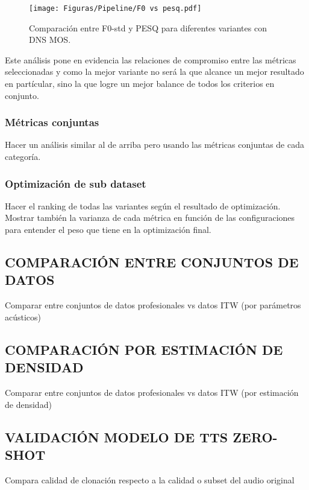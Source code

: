 \begin{figure}[h]
  \centering
  \centerline{\texttt{[image: Figuras/Pipeline/F0 vs pesq.pdf]}}
  \caption{Comparación entre F0-std y PESQ para diferentes variantes con DNS MOS.}
    \label{fig:F0_vs_PESQ}
\end{figure}

Este análisis pone en evidencia las relaciones de compromiso entre las métricas seleccionadas y como la mejor variante no será la que alcance un mejor resultado en partícular, sino la que logre un mejor balance de todos los criterios en conjunto.

\subsubsection{Métricas conjuntas}
Hacer un análisis similar al de arriba pero usando las métricas conjuntas de cada categoría. 

\subsubsection{Optimización de sub dataset}
Hacer el ranking de todas las variantes según el resultado de optimización. Mostrar también la varianza de cada métrica en función de las configuraciones para entender el peso que tiene en la optimización final.

\subsection{COMPARACIÓN ENTRE CONJUNTOS DE DATOS}
Comparar entre conjuntos de datos profesionales vs datos ITW (por parámetros acústicos)

\subsection{COMPARACIÓN POR ESTIMACIÓN DE DENSIDAD}
Comparar entre conjuntos de datos profesionales vs datos ITW (por estimación de densidad)

\subsection{VALIDACIÓN MODELO DE TTS ZERO-SHOT}
Compara calidad de clonación respecto a la calidad o subset del audio original
